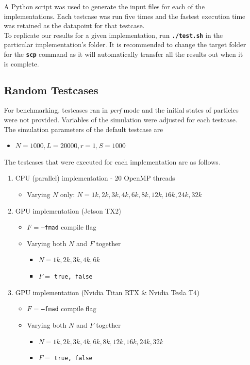 \documentclass[12pt]{article}
\newcommand{\bt}[1]{\texttt{\textbf{#1}}}
\begin{document}
A Python script was used to generate the input files for each of the implementations. Each testcase was run five times and the fastest execution time was retained as the datapoint for that testcase.\\

To replicate our results for a given implementation, run \bt{./test.sh} in the particular implementation's folder. It is recommended to change the target folder for the \bt{scp} command as it will automatically transfer all the results out when it is complete.

\subsection{Random Testcases}
\label{section:random-testcases}

For benchmarking, testcases ran in \textit{perf} mode and the initial states of particles were not provided. Variables of the simulation were adjusted for each testcase.\\

The simulation parameters of the default testcase are
\begin{itemize}
	\item $N = 1000, L=20000, r=1, S=1000$
\end{itemize}

The testcases that were executed for each implementation are as follows.
\begin{enumerate}
	\item CPU (parallel) implementation - 20 OpenMP threads
	\begin{itemize}
		\item Varying $N$ only: $N = 1k, 2k, 3k, 4k, 6k, 8k, 12k, 16k, 24k, 32k$
	\end{itemize}
	
	\item GPU implementation (Jetson TX2)
	\begin{itemize}
		\item $F$ = \texttt{--fmad} compile flag
		\item Varying both $N$ and $F$ together
		\begin{itemize}
			\item $N = 1k, 2k, 3k, 4k, 6k$
			\item $F =$ \texttt{true, false}
		\end{itemize}
	\end{itemize}
	
	\item GPU implementation (Nvidia Titan RTX \& Nvidia Tesla T4)
	\begin{itemize}
		\item $F$ = \texttt{--fmad} compile flag
		\item Varying both $N$ and $F$ together
		\begin{itemize}
			\item $N = 1k, 2k, 3k, 4k, 6k, 8k, 12k, 16k, 24k, 32k$
			\item $F =$ \texttt{true, false}
		\end{itemize}
	\end{itemize}
\end{enumerate}
\end{document}
